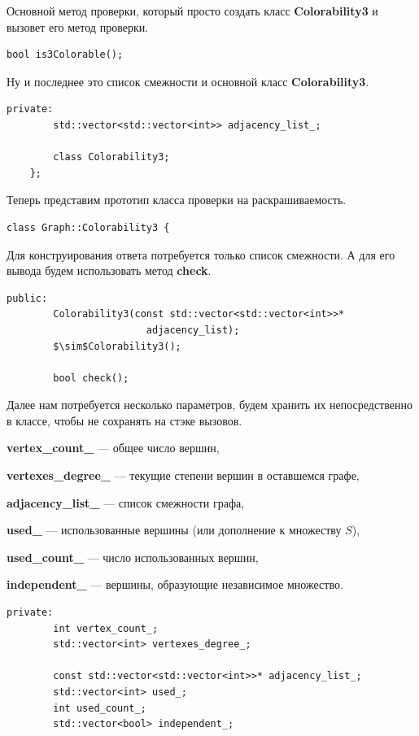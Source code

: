 \documentclass[12pt]{article}
\begin{document}
Основной метод проверки, который просто создать класс \textbf{Colorability3} и вы\-зо\-вет его метод проверки.

\begin{lstlisting}[mathescape=true]
        bool is3Colorable();
\end{lstlisting}

Ну и последнее это список смежности и основной класс \textbf{Colorability3}.

\begin{lstlisting}[mathescape=true]
    private:
        std::vector<std::vector<int>> adjacency_list_;
        
        class Colorability3;
    };
\end{lstlisting}

Теперь представим прототип класса проверки на раскрашиваемость.

\begin{lstlisting}[mathescape=true]
    class Graph::Colorability3 {
\end{lstlisting}

Для конструирования ответа потребуется только список смежности. А для его вы\-во\-да будем использовать метод \textbf{check}.

\begin{lstlisting}[mathescape=true]    
    public:
        Colorability3(const std::vector<std::vector<int>>* 
                        adjacency_list);
        $\sim$Colorability3();
    
        bool check();
\end{lstlisting}

Далее нам потребуется несколько параметров, будем хранить их непосредственно в классе, чтобы не сохранять на стэке вызовов. 

\textbf{vertex\_count\_} --- общее число вершин,

\textbf{vertexes\_degree\_} --- текущие степени вершин в оставшемся графе, 

\textbf{adjacency\_list\_} --- список смежности графа, 

\textbf{used\_} --- использованные вершины (или дополнение к множеству $S$), 

\textbf{used\_count\_} --- число использованных вершин, 

\textbf{independent\_} --- вершины, образующие независимое множество.

\begin{lstlisting}[mathescape=true]     
    private:
        int vertex_count_;
        std::vector<int> vertexes_degree_;
    
        const std::vector<std::vector<int>>* adjacency_list_;
        std::vector<int> used_; 
        int used_count_;
        std::vector<bool> independent_;
\end{lstlisting}
\end{document}
